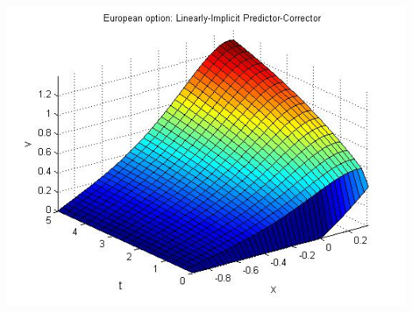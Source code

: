 \documentclass[a4paper]{article}
\begin{document}
\includegraphics[width=150mm,scale=1.0]{linImpPC.jpg}
\end{document}
